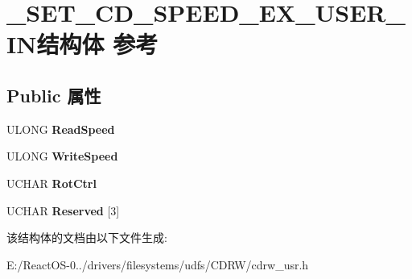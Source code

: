 \hypertarget{struct___s_e_t___c_d___s_p_e_e_d___e_x___u_s_e_r___i_n}{}\section{\+\_\+\+S\+E\+T\+\_\+\+C\+D\+\_\+\+S\+P\+E\+E\+D\+\_\+\+E\+X\+\_\+\+U\+S\+E\+R\+\_\+\+I\+N结构体 参考}
\label{struct___s_e_t___c_d___s_p_e_e_d___e_x___u_s_e_r___i_n}
\subsection*{Public 属性}
\begin{DoxyCompactItemize}
\item 
\mbox{\label{struct___s_e_t___c_d___s_p_e_e_d___e_x___u_s_e_r___i_n_a73e15efdfb7ccfff2839062fbfc28203}} 
U\+L\+O\+NG {\bfseries Read\+Speed}
\item 
\mbox{\label{struct___s_e_t___c_d___s_p_e_e_d___e_x___u_s_e_r___i_n_aa4c8e36999f0b583c265a332130d0f84}} 
U\+L\+O\+NG {\bfseries Write\+Speed}
\item 
\mbox{\label{struct___s_e_t___c_d___s_p_e_e_d___e_x___u_s_e_r___i_n_a2312ead05a4086b7f92aa26a2c8ccb95}} 
U\+C\+H\+AR {\bfseries Rot\+Ctrl}
\item 
\mbox{\label{struct___s_e_t___c_d___s_p_e_e_d___e_x___u_s_e_r___i_n_a304325019fdf50cbfddd0b2f198ec81a}} 
U\+C\+H\+AR {\bfseries Reserved} \mbox{[}3\mbox{]}
\end{DoxyCompactItemize}


该结构体的文档由以下文件生成\+:\begin{DoxyCompactItemize}
\item 
E\+:/\+React\+O\+S-\/0../drivers/filesystems/udfs/\+C\+D\+R\+W/cdrw\+\_\+usr.\+h\end{DoxyCompactItemize}
